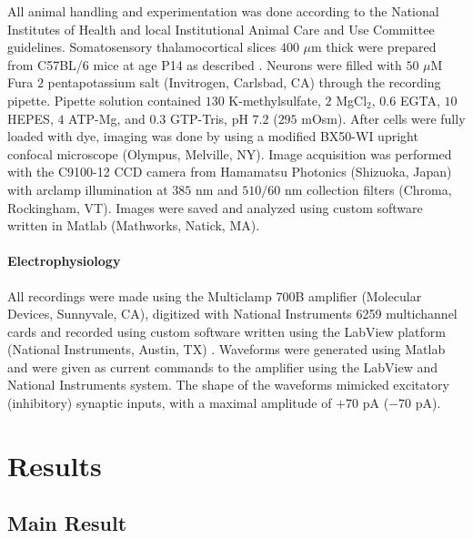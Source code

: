 All animal handling and experimentation was done according to the National Institutes of Health and local Institutional Animal Care and Use Committee guidelines. Somatosensory thalamocortical slices $400$ $\mu$m thick were prepared from C57BL/6 mice at age P14 as described \cite{MacLeanYuste05}. Neurons were filled with $50$ $\mu$M Fura $2$ pentapotassium salt (Invitrogen, Carlsbad, CA) through the recording pipette. Pipette solution contained $130$ K-methylsulfate, $2$ MgCl$_2$, $0.6$ EGTA, $10$ HEPES, $4$ ATP-Mg, and $0.3$ GTP-Tris, pH $7.2$ ($295$ mOsm).  After cells were fully loaded with dye, imaging was done by using a modified BX50-WI upright confocal microscope (Olympus, Melville, NY).  Image acquisition was performed with the C9100-12 CCD camera from Hamamatsu Photonics (Shizuoka, Japan) with arclamp illumination at $385$ nm and $510/60$ nm collection filters (Chroma, Rockingham, VT).  Images were saved and analyzed using custom software written in Matlab (Mathworks, Natick, MA).

\paragraph{Electrophysiology}

All recordings were made using the Multiclamp 700B amplifier (Molecular Devices, Sunnyvale, CA), digitized with National Instruments 6259 multichannel cards and recorded using custom software written using the LabView platform (National Instruments, Austin, TX) .  Waveforms were generated using Matlab and were given as current commands to the amplifier using the LabView and National Instruments system. The shape of the waveforms mimicked excitatory (inhibitory) synaptic inputs, with a maximal amplitude of $+70$ pA ($-70$ pA).









\section{Results} \label{sec:results}

\subsection{Main Result} \label{sec:main}

